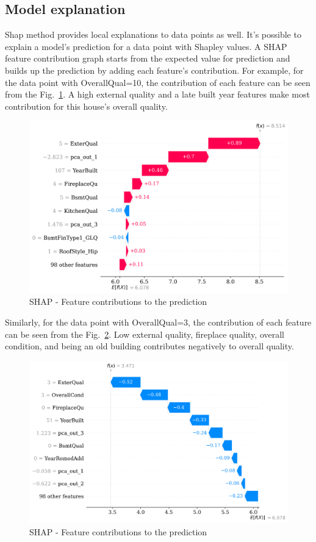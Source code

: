 \documentclass[conference]{IEEEtran}
\begin{document}
\subsection{Model explanation}

Shap method provides local explanations to data points as well. It's possible 
to explain a model's prediction for a data point with Shapley values. 
A SHAP feature contribution graph starts from the 
expected value for prediction and builds up the prediction by adding each feature's
contribution.
For example, for the data point with OverallQual=10, 
the contribution of each feature can be seen from the Fig.~\ref{fig:shap-local-10}.
A high external quality and a late built year features make most contribution for this house's overall quality. 
\begin{figure}[htbp]
    \centerline{\includegraphics[width = 0.5 \textwidth]{shap-local-10.png}}
    \caption{SHAP - Feature contributions to the prediction}
    \label{fig:shap-local-10}
\end{figure}

Similarly, for the data point with OverallQual=3, 
the contribution of each feature can be seen from the Fig.~\ref{fig:shap-local-3}.
Low external quality, fireplace quality, overall condition, and being an old building 
contributes negatively to overall quality.
\begin{figure}[htbp]
    \centerline{\includegraphics[width = 0.5 \textwidth]{shap-local-3.png}}
    \caption{SHAP - Feature contributions to the prediction}
    \label{fig:shap-local-3}
\end{figure}
\end{document}
